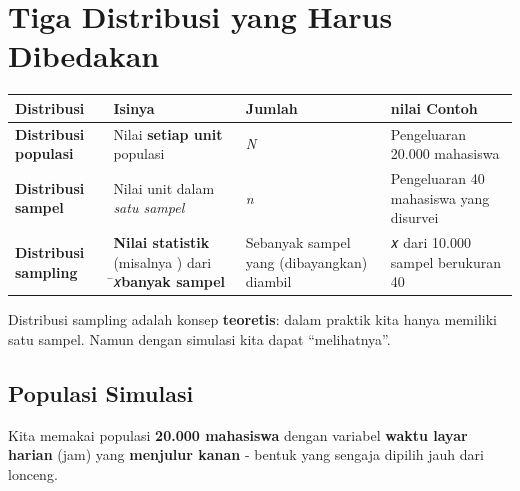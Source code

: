 \documentclass[
  indonesian,
  letterpaper,
]{book}
\newcounter{none} %
\begin{document}
\section{Tiga Distribusi yang Harus
Dibedakan}\label{tiga-distribusi-yang-harus-dibedakan}

{\def\LTcaptype{none} %
\begin{longtable}[]{@{}
  >{\raggedright\arraybackslash}p{}
  >{\raggedright\arraybackslash}p{}
  >{\raggedright\arraybackslash}p{}
  >{\raggedright\arraybackslash}p{}@{}}
\toprule\noalign{}
\begin{minipage}[b]{\linewidth}\raggedright
Distribusi
\end{minipage} & \begin{minipage}[b]{\linewidth}\raggedright
Isinya
\end{minipage} & \begin{minipage}[b]{\linewidth}\raggedright
Jumlah
\end{minipage} & \begin{minipage}[b]{\linewidth}\raggedright
nilai Contoh
\end{minipage} \\
\midrule\noalign{}
\endhead
\bottomrule\noalign{}
\endlastfoot
\textbf{Distribusi populasi} & Nilai \textbf{setiap unit} populasi &
\emph{N} & Pengeluaran 20.000 mahasiswa \\
\textbf{Distribusi sampel} & Nilai unit dalam \emph{satu sampel} &
\emph{n} & Pengeluaran 40 mahasiswa yang disurvei \\
\textbf{Distribusi sampling} & \textbf{Nilai statistik} (misalnya ) dari
̄𝑥\textbf{banyak sampel} & Sebanyak sampel yang (dibayangkan) diambil &
𝑥 dari 10.000 sampel berukuran 40 \\
\end{longtable}
}

Distribusi sampling adalah konsep \textbf{teoretis}: dalam praktik kita
hanya memiliki satu sampel. Namun dengan simulasi kita dapat
``melihatnya''.

\subsection{Populasi Simulasi}\label{populasi-simulasi}

Kita memakai populasi \textbf{20.000 mahasiswa} dengan variabel
\textbf{waktu layar harian} (jam) yang \textbf{menjulur kanan} - bentuk
yang sengaja dipilih jauh dari lonceng.
\end{document}
